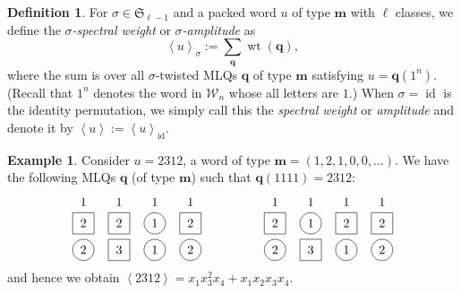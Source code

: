 \documentclass[reqno]{amsart}
\newcommand{\0}{\phantom{c}}
\newcommand{\swt}[1]{\left\langle #1 \right\rangle} %
\newcommand{\SymGp}[1]{\mathfrak{S}_{#1}} %
\DeclareMathOperator{\wt}{wt} %
\DeclareMathOperator{\id}{id} %
\newcommand{\mm}{\mathbf{m}}
\newcommand{\qq}{\mathbf{q}}
\newcommand{\mcW}{\mathcal{W}}
\let\sumnonlimits\sum
\renewcommand{\sum}{\sumnonlimits\limits}
\newcommand{\tup}[1]{\left( #1 \right)}
\newcommand{\defn}[1]{{\color{darkred}\emph{#1}}} %
\theoremstyle{plain}
\theoremstyle{definition}
\newtheorem{dfn}[thm]{Definition}
\newtheorem{example}[thm]{Example}
\numberwithin{equation}{section}
\begin{document}
\begin{dfn}
For $\sigma \in \SymGp{\ell-1}$ and a packed word $u$ of type $\mm$ with $\ell$ classes, we define the \defn{$\sigma$-spectral weight} or \defn{$\sigma$-amplitude} as
\[
  \swt{u}_{\sigma} := \sum_{\qq} \wt(\qq),
\]
where the sum is over all $\sigma$-twisted MLQs $\qq$ of type $\mm$ satisfying $u = \qq(1^n)$.
(Recall that $1^n$ denotes the word in $\mcW_n$ whose all letters are $1$.)
When $\sigma = \id$ is the identity permutation, we simply call this the \defn{spectral weight} or \defn{amplitude} and denote it by $\swt{u} := \swt{u}_{\id}$.
\end{dfn}

\begin{example}
\label{ex:spectral_weight_example}
Consider $u = 2312$, a word of type $\mm = \tup{1,2,1,0,0,\ldots}$.
We have the following MLQs $\qq$ (of type $\mm$) such that $\qq(1111) = 2312$:
\[
\begin{tikzpicture}[baseline=-30]
  \def\ll{0.75}   %
  \foreach \i in {3} { \draw (\i,\ll*-1) circle (0.3); }
  \foreach \i in {1,2,4} { \draw (\i-.3,\ll*-1 -.3) rectangle +(0.6,+0.6); }
  \foreach \i in {1,3,4} { \draw (\i,\ll*-2) circle (0.3); }
  \foreach \i in {2} { \draw (\i-.3,\ll*-2 -.3) rectangle +(0.6,+0.6); }
  \foreach \i in {1,2,3,4} { \node at (\i, \ll*0-.15) {$1$}; }
  \foreach \i in {3} { \node at (\i, \ll*-1) {$1$}; }
  \foreach \i in {1,2,4} { \node at (\i, \ll*-1) {$2$}; }
  \foreach \i in {3} { \node at (\i, \ll*-2) {$1$}; }
  \foreach \i in {1,4} { \node at (\i, \ll*-2) {$2$}; }
  \foreach \i in {2} { \node at (\i, \ll*-2) {$3$}; }
\end{tikzpicture}
\hspace{50pt}
\begin{tikzpicture}[baseline=-30]
  \def\ll{0.75}   %
  \foreach \i in {2} { \draw (\i,\ll*-1) circle (0.3); }
  \foreach \i in {1,3,4} { \draw (\i-.3,\ll*-1 -.3) rectangle +(0.6,+0.6); }
  \foreach \i in {1,3,4} { \draw (\i,\ll*-2) circle (0.3); }
  \foreach \i in {2} { \draw (\i-.3,\ll*-2 -.3) rectangle +(0.6,+0.6); }
  \foreach \i in {1,2,3,4} { \node at (\i, \ll*0-.15) {$1$}; }
  \foreach \i in {2} { \node at (\i, \ll*-1) {$1$}; }
  \foreach \i in {1,3,4} { \node at (\i, \ll*-1) {$2$}; }
  \foreach \i in {3} { \node at (\i, \ll*-2) {$1$}; }
  \foreach \i in {1,4} { \node at (\i, \ll*-2) {$2$}; }
  \foreach \i in {2} { \node at (\i, \ll*-2) {$3$}; }
\end{tikzpicture}
\]
and hence we obtain $\swt{2312} = x_1 x_3^2 x_4 + x_1 x_2 x_3 x_4$.

\end{example}
\end{document}
